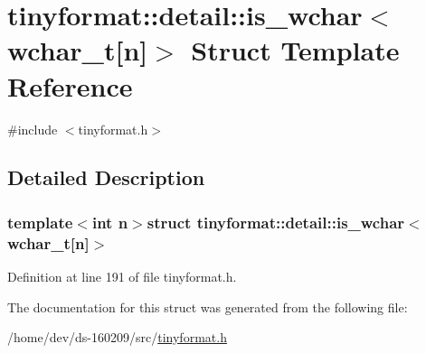 \hypertarget{structtinyformat_1_1detail_1_1is__wchar_3_01wchar__t[n]_4}{}\section{tinyformat\+:\+:detail\+:\+:is\+\_\+wchar$<$ wchar\+\_\+t\mbox{[}n\mbox{]}$>$ Struct Template Reference}
\label{structtinyformat_1_1detail_1_1is__wchar_3_01wchar__t[n]_4}


{\ttfamily \#include $<$tinyformat.\+h$>$}



\subsection{Detailed Description}
\subsubsection*{template$<$int n$>$struct tinyformat\+::detail\+::is\+\_\+wchar$<$ wchar\+\_\+t\mbox{[}n\mbox{]}$>$}



Definition at line 191 of file tinyformat.\+h.



The documentation for this struct was generated from the following file\+:\begin{DoxyCompactItemize}
\item 
/home/dev/ds-\/160209/src/\hyperlink{tinyformat_8h}{tinyformat.\+h}\end{DoxyCompactItemize}
